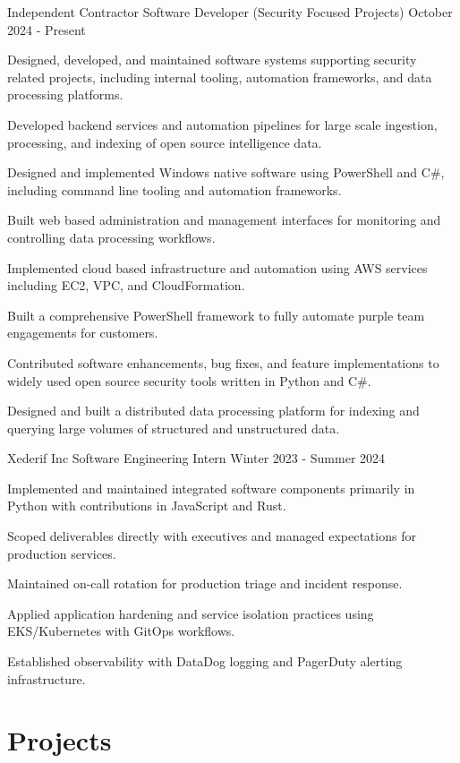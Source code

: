 \documentclass{../styles/resume}
\begin{document}
\subsectionpositiondate
    {Independent Contractor}
    {Software Developer (Security Focused Projects)}
    {October 2024 - Present}
\resumesublistbegin
    \item Designed, developed, and maintained software systems supporting security related projects, including internal tooling, automation frameworks, and data processing platforms.
    \item Developed backend services and automation pipelines for large scale ingestion, processing, and indexing of open source intelligence data.
    \item Designed and implemented Windows native software using PowerShell and C\#, including command line tooling and automation frameworks.
    \item Built web based administration and management interfaces for monitoring and controlling data processing workflows.
    \item Implemented cloud based infrastructure and automation using AWS services including EC2, VPC, and CloudFormation.
    \item Built a comprehensive PowerShell framework to fully automate purple team engagements for customers.
    \item Contributed software enhancements, bug fixes, and feature implementations to widely used open source security tools written in Python and C\#.
    \item Designed and built a distributed data processing platform for indexing and querying large volumes of structured and unstructured data.
\resumesublistend

\subsectionpositiondate
    {Xederif Inc}
    {Software Engineering Intern}
    {Winter 2023 - Summer 2024}
\resumesublistbegin
    \item Implemented and maintained integrated software components primarily in Python with contributions in JavaScript and Rust.
    \item Scoped deliverables directly with executives and managed expectations for production services.
    \item Maintained on-call rotation for production triage and incident response.
    \item Applied application hardening and service isolation practices using EKS/Kubernetes with GitOps workflows.
    \item Established observability with DataDog logging and PagerDuty alerting infrastructure.
\resumesublistend

\section{Projects}
\end{document}
